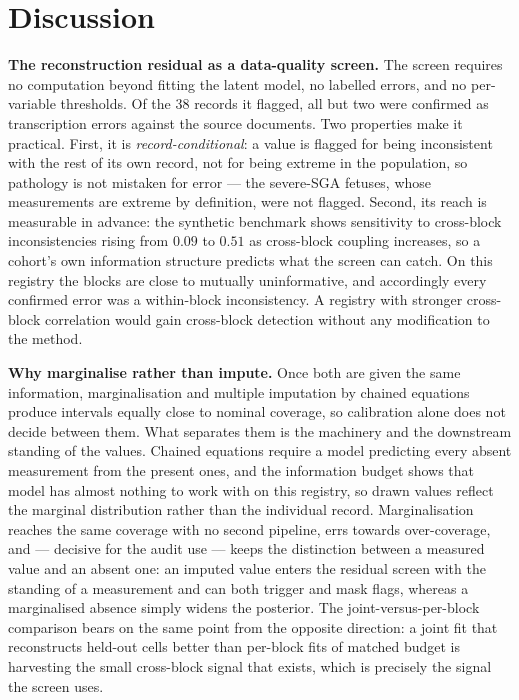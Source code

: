 \documentclass[a4paper,fleqn]{cas-sc}
\begin{document}
\section{Discussion}
\label{sec:disc}

\noindent\textbf{The reconstruction residual as a data-quality screen.}
The screen requires no computation beyond fitting the latent model, no labelled errors, and no per-variable thresholds. Of the $38$ records it flagged, all but two were confirmed as transcription errors against the source documents. Two properties make it practical. First, it is \emph{record-conditional}: a value is flagged for being inconsistent with the rest of its own record, not for being extreme in the population, so pathology is not mistaken for error --- the severe-SGA fetuses, whose measurements are extreme by definition, were not flagged. Second, its reach is measurable in advance: the synthetic benchmark shows sensitivity to cross-block inconsistencies rising from $0.09$ to $0.51$ as cross-block coupling increases, so a cohort's own information structure predicts what the screen can catch. On this registry the blocks are close to mutually uninformative, and accordingly every confirmed error was a within-block inconsistency. A registry with stronger cross-block correlation would gain cross-block detection without any modification to the method.

\noindent\textbf{Why marginalise rather than impute.}
Once both are given the same information, marginalisation and multiple imputation by chained equations produce intervals equally close to nominal coverage, so calibration alone does not decide between them. What separates them is the machinery and the downstream standing of the values. Chained equations require a model predicting every absent measurement from the present ones, and the information budget shows that model has almost nothing to work with on this registry, so drawn values reflect the marginal distribution rather than the individual record. Marginalisation reaches the same coverage with no second pipeline, errs towards over-coverage, and --- decisive for the audit use --- keeps the distinction between a measured value and an absent one: an imputed value enters the residual screen with the standing of a measurement and can both trigger and mask flags, whereas a marginalised absence simply widens the posterior. The joint-versus-per-block comparison bears on the same point from the opposite direction: a joint fit that reconstructs held-out cells better than per-block fits of matched budget is harvesting the small cross-block signal that exists, which is precisely the signal the screen uses.
\end{document}
